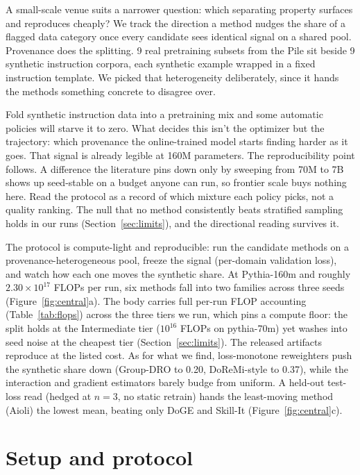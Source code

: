 \documentclass{article}
\begin{document}
A small-scale venue suits a narrower question: which separating property surfaces and reproduces cheaply? We track the direction a method nudges the share of a flagged data category once every candidate sees identical signal on a shared pool. Provenance does the splitting. 9 real pretraining subsets from the Pile \citep{pile2021} sit beside 9 synthetic instruction corpora, each synthetic example wrapped in a fixed instruction template. We picked that heterogeneity deliberately, since it hands the methods something concrete to disagree over.

Fold synthetic instruction data into a pretraining mix and some automatic policies will starve it to zero. What decides this isn't the optimizer but the trajectory: which provenance the online-trained model starts finding harder as it goes. That signal is already legible at 160M parameters. The reproducibility point follows. A difference the literature pins down only by sweeping from 70M to 7B shows up seed-stable on a budget anyone can run, so frontier scale buys nothing here. Read the protocol as a record of which mixture each policy picks, not a quality ranking. The null that no method consistently beats stratified sampling \citep{aioli2024} holds in our runs (Section~\ref{sec:limits}), and the directional reading survives it.

The protocol is compute-light and reproducible: run the candidate methods on a provenance-heterogeneous pool, freeze the signal (per-domain validation loss), and watch how each one moves the synthetic share. At Pythia-160m \citep{pythia2023} and roughly $2.30\times10^{17}$ FLOPs per run, six methods fall into two families across three seeds (Figure~\ref{fig:central}a). The body carries full per-run FLOP accounting (Table~\ref{tab:flops}) across the three tiers we run, which pins a compute floor: the split holds at the Intermediate tier ($10^{16}$ FLOPs on pythia-70m) yet washes into seed noise at the cheapest tier (Section~\ref{sec:limits}). The released artifacts reproduce at the listed cost. As for what we find, loss-monotone reweighters push the synthetic share down (Group-DRO to 0.20, DoReMi-style to 0.37), while the interaction and gradient estimators barely budge from uniform. A held-out test-loss read (hedged at $n=3$, no static retrain) hands the least-moving method (Aioli) the lowest mean, beating only DoGE and Skill-It (Figure~\ref{fig:central}c).

\section{Setup and protocol}
\label{sec:setup}
\end{document}
